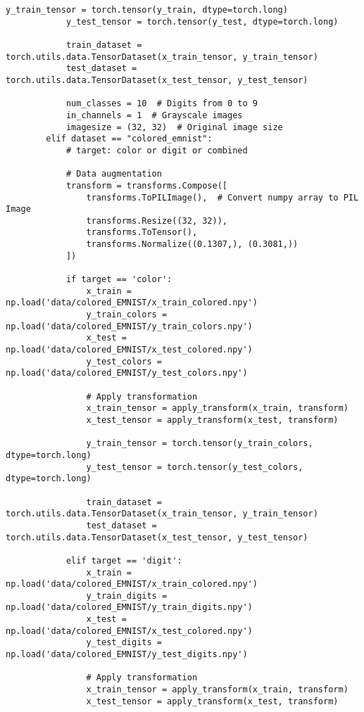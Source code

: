\begin{lstlisting}[style=pythonstyle, caption={Program Example}]
            y_train_tensor = torch.tensor(y_train, dtype=torch.long)
            y_test_tensor = torch.tensor(y_test, dtype=torch.long)
    
            train_dataset = torch.utils.data.TensorDataset(x_train_tensor, y_train_tensor)
            test_dataset = torch.utils.data.TensorDataset(x_test_tensor, y_test_tensor)
    
            num_classes = 10  # Digits from 0 to 9
            in_channels = 1  # Grayscale images
            imagesize = (32, 32)  # Original image size
        elif dataset == "colored_emnist":
            # target: color or digit or combined
            
            # Data augmentation
            transform = transforms.Compose([
                transforms.ToPILImage(),  # Convert numpy array to PIL Image
                transforms.Resize((32, 32)),
                transforms.ToTensor(),
                transforms.Normalize((0.1307,), (0.3081,))
            ])
            
            if target == 'color':
                x_train = np.load('data/colored_EMNIST/x_train_colored.npy')
                y_train_colors = np.load('data/colored_EMNIST/y_train_colors.npy')
                x_test = np.load('data/colored_EMNIST/x_test_colored.npy')
                y_test_colors = np.load('data/colored_EMNIST/y_test_colors.npy')
                
                # Apply transformation
                x_train_tensor = apply_transform(x_train, transform)
                x_test_tensor = apply_transform(x_test, transform)
                
                y_train_tensor = torch.tensor(y_train_colors, dtype=torch.long)
                y_test_tensor = torch.tensor(y_test_colors, dtype=torch.long)
                
                train_dataset = torch.utils.data.TensorDataset(x_train_tensor, y_train_tensor)
                test_dataset = torch.utils.data.TensorDataset(x_test_tensor, y_test_tensor)
            
            elif target == 'digit':
                x_train = np.load('data/colored_EMNIST/x_train_colored.npy')
                y_train_digits = np.load('data/colored_EMNIST/y_train_digits.npy')
                x_test = np.load('data/colored_EMNIST/x_test_colored.npy')
                y_test_digits = np.load('data/colored_EMNIST/y_test_digits.npy')
                
                # Apply transformation
                x_train_tensor = apply_transform(x_train, transform)
                x_test_tensor = apply_transform(x_test, transform)
                

\end{lstlisting}
